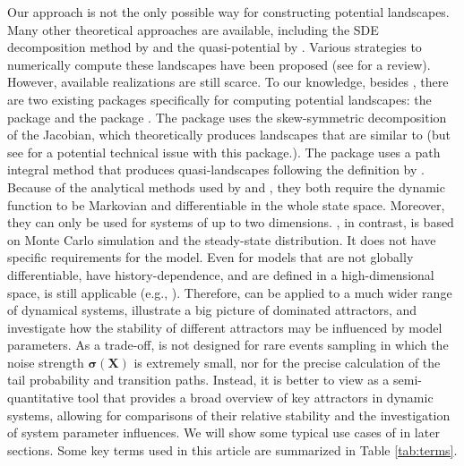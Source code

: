 Our approach is not the only possible way for constructing potential landscapes. Many other theoretical approaches are available, including the SDE decomposition method by \citet{AoPotentialStochasticDifferential2004} and the quasi-potential by \citet{FreidlinWentzellRandomPerturbationsDynamical2012}. Various strategies to numerically compute these landscapes have been proposed (see \citet{zhouConstructionLandscapeMultistable2016} for a review). However, available realizations are still scarce. To our knowledge, besides , there are two existing packages specifically for computing potential landscapes: the  package \citep{rodriguez-sanchezPabRodRolldownPostpublication2020} and the  package \citep{MooreEtAlQPotPackageStochastic2016, dahiyaOrderedLineIntegral2018}. The  package uses the skew-symmetric decomposition of the Jacobian, which theoretically produces landscapes that are similar to \citet{wangPotentialLandscapeFlux2008} (but see \citet{CuiEtAlCommentsClimbingEscher2023} for a potential technical issue with this package.). The  package uses a path integral method that produces quasi-landscapes following the definition by \citet{FreidlinWentzellRandomPerturbationsDynamical2012}. Because of the analytical methods used by  and , they both require the dynamic function to be Markovian and differentiable in the whole state space. Moreover, they can only be used for systems of up to two dimensions. , in contrast, is based on Monte Carlo simulation and the steady-state distribution. It does not have specific requirements for the model. Even for models that are not globally differentiable, have history-dependence, and are defined in a high-dimensional space,  is still applicable (e.g., \citet{CuiEtAlMetaphorComputationConstructing2021}). Therefore,  can be applied to a much wider range of dynamical systems, illustrate a big picture of dominated attractors, and investigate how the stability of different attractors may be influenced by model parameters. As a trade-off,  is not designed for rare events sampling in which the noise strength \(\boldsymbol{\sigma}(\boldsymbol{X})\) is extremely small, nor for the precise calculation of the tail probability and transition paths. Instead, it is better to view  as a semi-quantitative tool that provides a broad overview of key attractors in dynamic systems, allowing for comparisons of their relative stability and the investigation of system parameter influences. We will show some typical use cases of  in later sections. Some key terms used in this article are summarized in Table \ref{tab:terms}.


